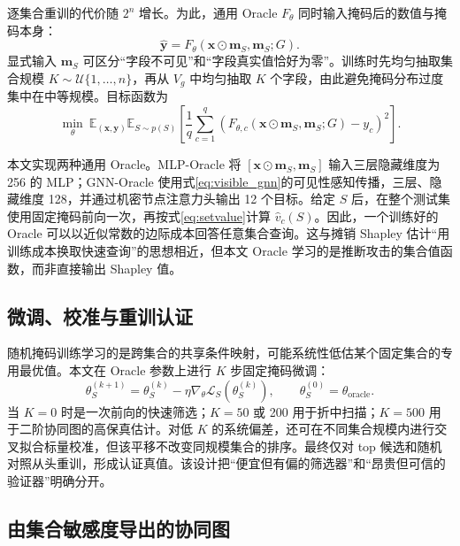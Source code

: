 \documentclass[UTF8,a4paper,zihao=5,fontset=fandol]{ctexart}
\begin{document}
逐集合重训的代价随 $2^n$ 增长。为此，通用 Oracle $F_\theta$ 同时输入掩码后的数值与掩码本身：
\begin{equation}
  \widehat{\bm y}
  =F_\theta(\bm x\odot\bm m_S,\bm m_S;G).
  \label{eq:oracle}
\end{equation}
显式输入 $\bm m_S$ 可区分“字段不可见”和“字段真实值恰好为零”。训练时先均匀抽取集合规模 $K\sim\mathcal U\{1,\dots,n\}$，再从 $V_g$ 中均匀抽取 $K$ 个字段，由此避免掩码分布过度集中在中等规模。目标函数为
\begin{equation}
  \min_\theta\
  \mathbb E_{(\bm x,\bm y)}
  \mathbb E_{S\sim p(S)}
  \left[
  \frac{1}{q}\sum_{c=1}^{q}
  \left(F_{\theta,c}(\bm x\odot\bm m_S,\bm m_S;G)-y_c\right)^2
  \right].
  \label{eq:masktrain}
\end{equation}

本文实现两种通用 Oracle。MLP-Oracle 将 $[\bm x\odot\bm m_S,\bm m_S]$ 输入三层隐藏维度为 256 的 MLP；GNN-Oracle 使用式\eqref{eq:visible_gnn}的可见性感知传播，三层、隐藏维度 128，并通过机密节点注意力头输出 12 个目标。给定 $S$ 后，在整个测试集使用固定掩码前向一次，再按式\eqref{eq:setvalue}计算 $\widehat v_c(S)$。因此，一个训练好的 Oracle 可以以近似常数的边际成本回答任意集合查询。这与摊销 Shapley 估计“用训练成本换取快速查询”的思想相近\citep{jethani2022fastshap}，但本文 Oracle 学习的是推断攻击的集合值函数，而非直接输出 Shapley 值。

\subsection{微调、校准与重训认证}

随机掩码训练学习的是跨集合的共享条件映射，可能系统性低估某个固定集合的专用最优值。本文在 Oracle 参数上进行 $K$ 步固定掩码微调：
\begin{equation}
  \theta_{S}^{(k+1)}
  =\theta_S^{(k)}-\eta\nabla_{\theta}
  \mathcal L_S(\theta_S^{(k)}),\qquad
  \theta_S^{(0)}=\theta_{\mathrm{oracle}}.
\end{equation}
当 $K=0$ 时是一次前向的快速筛选；$K=50$ 或 200 用于折中扫描；$K=500$ 用于二阶协同图的高保真估计。对低 $K$ 的系统偏差，还可在不同集合规模内进行交叉拟合标量校准，但该平移不改变同规模集合的排序。最终仅对 top 候选和随机对照从头重训，形成认证真值。该设计把“便宜但有偏的筛选器”和“昂贵但可信的验证器”明确分开。

\subsection{由集合敏感度导出的协同图}
\end{document}
